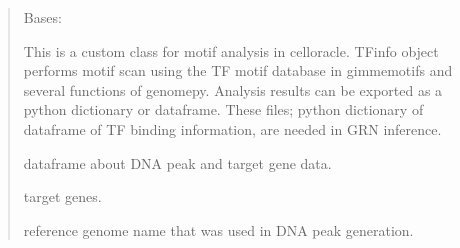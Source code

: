 \documentclass[letterpaper,10pt,english]{sphinxmanual}
\begin{document}
\begin{quote}
\begin{fulllineitems}
\end{fulllineitems}


\begin{fulllineitems}
\label{\detokenize{modules/celloracle.motif_analysis:celloracle.motif_analysis.TFinfo}}
Bases: 

This is a custom class for motif analysis in celloracle.
TFinfo object performs motif scan using the TF motif database in gimmemotifs and several functions of genomepy.
Analysis results can be exported as a python dictionary or dataframe.
These files; python dictionary of dataframe of TF binding information, are needed in GRN inference.

\begin{fulllineitems}
\label{\detokenize{modules/celloracle.motif_analysis:celloracle.motif_analysis.TFinfo.peak_df}}
 \textendash{} dataframe about DNA peak and target gene data.

\end{fulllineitems}


\begin{fulllineitems}
\label{\detokenize{modules/celloracle.motif_analysis:celloracle.motif_analysis.TFinfo.all_target_gene}}
 \textendash{} target genes.

\end{fulllineitems}


\begin{fulllineitems}
\label{\detokenize{modules/celloracle.motif_analysis:celloracle.motif_analysis.TFinfo.ref_genome}}
 \textendash{} reference genome name that was used in DNA peak generation.

\end{fulllineitems}


\end{fulllineitems}
\end{quote}
\end{document}
